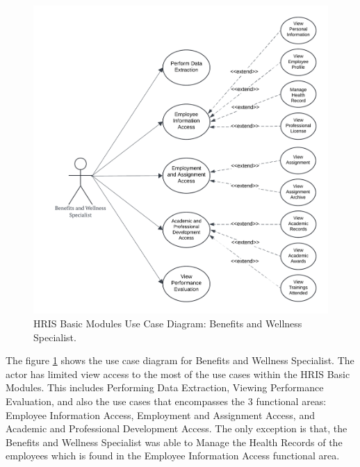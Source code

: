     \begin{figure}[H]
        \centering
        \includegraphics[width=0.9\linewidth]{figures/images/diagrams/usecase/use-case-basic-6.png}
        \caption{HRIS Basic Modules Use Case Diagram: Benefits and Wellness Specialist.}
        \label{fig:use-case-basic-6}
    \end{figure}

    The figure \ref{fig:use-case-basic-6} shows the use case diagram for Benefits and Wellness Specialist. The actor has limited view access to the most of the use cases within the HRIS Basic Modules. This includes Performing Data Extraction, Viewing Performance Evaluation, and also the use cases that  encompasses the 3 functional areas: Employee Information Access, Employment and Assignment Access, and Academic and Professional Development Access. The only exception is that, the Benefits and Wellness Specialist was able to Manage the Health Records of the employees which is found in the Employee Information Access functional area.


